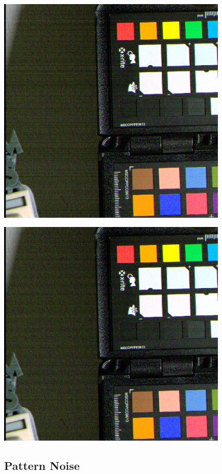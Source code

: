 \begin{center}
\includegraphics[height=11cm]{images/10ms+4-darkcurrent-no-blackcol-crop}
\end{center}

\begin{center}
\includegraphics[height=11cm]{images/10ms+4-darkcurrent-crop}
\end{center}


    

\subsection{Pattern Noise}

